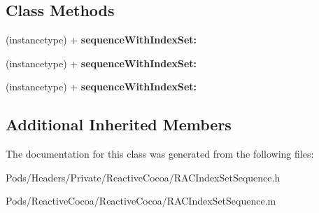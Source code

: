 \subsection*{Class Methods}
\begin{DoxyCompactItemize}
\item 
\mbox{\label{interface_r_a_c_index_set_sequence_aceb8f15b47239d3ca763c0139cbcfeb4}} 
(instancetype) + {\bfseries sequence\+With\+Index\+Set\+:}
\item 
\mbox{\label{interface_r_a_c_index_set_sequence_aceb8f15b47239d3ca763c0139cbcfeb4}} 
(instancetype) + {\bfseries sequence\+With\+Index\+Set\+:}
\item 
\mbox{\label{interface_r_a_c_index_set_sequence_aceb8f15b47239d3ca763c0139cbcfeb4}} 
(instancetype) + {\bfseries sequence\+With\+Index\+Set\+:}
\end{DoxyCompactItemize}
\subsection*{Additional Inherited Members}


The documentation for this class was generated from the following files\+:\begin{DoxyCompactItemize}
\item 
Pods/\+Headers/\+Private/\+Reactive\+Cocoa/R\+A\+C\+Index\+Set\+Sequence.\+h\item 
Pods/\+Reactive\+Cocoa/\+Reactive\+Cocoa/R\+A\+C\+Index\+Set\+Sequence.\+m\end{DoxyCompactItemize}
